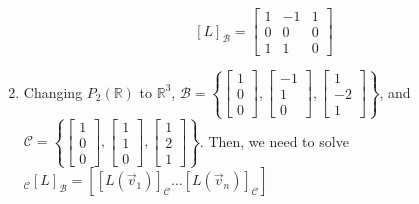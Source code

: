 \documentclass[10pt,english]{article}
\begin{document}
\begin{enumerate}
$$[L]_\mathcal{B}=\begin{bmatrix}1&-1&1\\0&0&0\\1&1&0\end{bmatrix}$$




\pagebreak
\item Changing $P_2(\mathbb{R})$ to $\mathbb{R}^3$, $\mathcal{B}=\left\{\begin{bmatrix}1\\0\\0\end{bmatrix},\begin{bmatrix}-1\\1\\0\end{bmatrix},\begin{bmatrix}1\\-2\\1\end{bmatrix}\right\}$, and $\mathcal{C}=\left\{\begin{bmatrix}1\\0\\0\end{bmatrix},\begin{bmatrix}1\\1\\0\end{bmatrix},\begin{bmatrix}1\\2\\1\end{bmatrix}\right\}$. Then, we need to solve $_\mathcal{C}[L]_\mathcal{B}=\left[[L(\vec{v}_1)]_\mathcal{C}\ldots[L(\vec{v}_n)]_\mathcal{C}\right]$\\ 



\end{enumerate}
\end{document}
